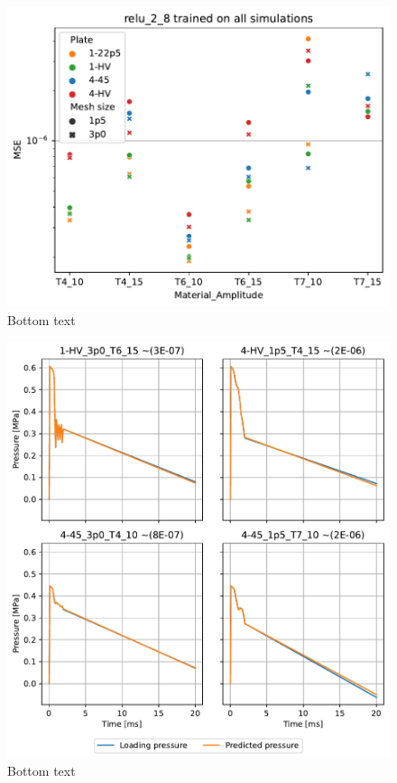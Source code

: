 \begin{figure}
    \centering
    \includegraphics[width=\textwidth]{Chapter/05_results/figures/para4_all.pdf}
    \caption{Bottom text}
    \label{fig:para4_all}
\end{figure}

\begin{figure}
    \centering
    \includegraphics[width=\textwidth]{Chapter/05_results/figures/para4_test.pdf}
    \caption{Bottom text}
    \label{fig:para4_test}
\end{figure}

